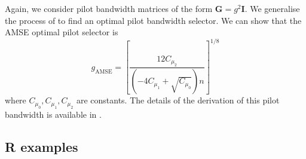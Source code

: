\documentclass[a4paper,11pt]{article}
\newcommand{\mat}[1]{\mathbf{#1}}
\def\G{\mat{G}}
\def\AMSE{\mathrm{AMSE}}
\begin{document}
Again, we consider pilot bandwidth matrices of the form  $\G = g^2 \mat{I}$.
We generalise the process of \citet*{jones91b} to find an optimal 
pilot bandwidth selector.
We can show that the AMSE optimal pilot selector is
\begin{equation}
g_\AMSE = \left[ \frac{12 C_{\mu_2}}
 { (-4 C_{\mu_1} + \sqrt{C_{\mu_0}}) n }\right] ^{1/8}
\label{eq:gamse}
\end{equation}
where $C_{\mu_0}, C_{\mu_1}, C_{\mu_2}$ are constants.  The details of the derivation
of this pilot bandwidth is available in \citet*{duong05}.

\subsection{R examples}
\label{sec:pi_eg}
\end{document}
